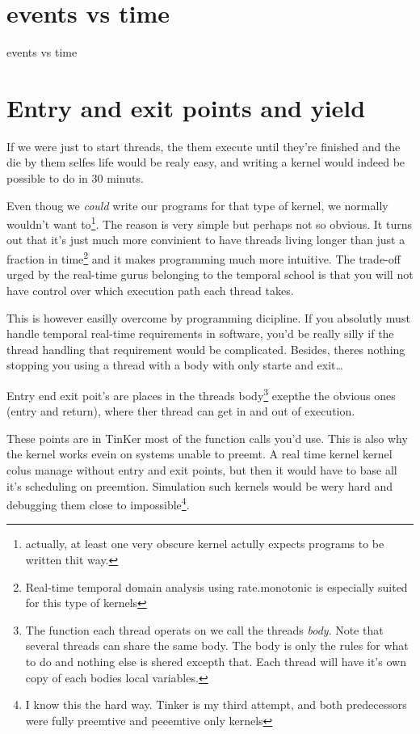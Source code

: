 		\section{events vs time}
		events vs time

		\section{Entry and exit points and yield}
		If we were just to start threads, the them execute until they're finished and the die by them selfes life would be realy easy, and writing a kernel would indeed be possible to do in 30 minuts.

		Even thoug we \textit{could} write our programs for that type of kernel, we normally wouldn't want to\footnote{actually, at least one very obscure kernel actully expects programs to be written thit way.}. The reason is very simple but perhaps not so obvious. It turns out that it's just much more convinient to have threads living longer than just a fraction in time\footnote{Real-time temporal domain analysis using rate.monotonic is especially suited for this type of kernels} and it makes programming much more intuitive. The trade-off urged by the real-time gurus belonging to the temporal school is that you will not have control over which execution path each thread takes.

		This is however easilly overcome by programming dicipline. If you absolutly must handle temporal real-time requirements in software, you'd be really silly if the thread handling that requirement would be complicated. Besides, theres nothing stopping you using a thread with a body with only starte and exit\ldots

		Entry end exit poit's are places in the threads body\footnote{The function each thread operats on we call the threads \textit{body}. Note that several threads can share the same body. The body is only the rules for what to do and nothing else is shered excepth that. Each thread will have it's own copy of each bodies local variables.} exepthe the obvious ones (entry and return), where ther thread can get in and out of execution. 

		These points are in TinKer most of the function calls you'd use. This is also why the kernel works evein on systems unable to preemt. A real time kernel kernel colus manage without entry and exit points, but then it would have to base all it's scheduling on preemtion. Simulation such kernels would be wery hard and debugging them close to impossible\footnote{I know this the hard way. Tinker is my third attempt, and both predecessors were fully preemtive and peeemtive only kernels}. 

